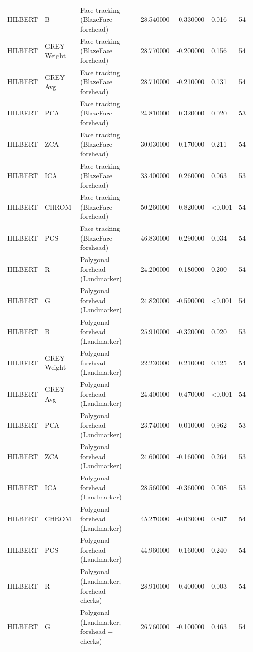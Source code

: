 \begin{table}[htbp]
\begin{tabular}{l l l r r l r}
HILBERT & B & Face tracking (BlazeFace forehead) & 28.540000 & -0.330000 & 0.016 & 54 \\
HILBERT & GREY Weight & Face tracking (BlazeFace forehead) & 28.770000 & -0.200000 & 0.156 & 54 \\
HILBERT & GREY Avg & Face tracking (BlazeFace forehead) & 28.710000 & -0.210000 & 0.131 & 54 \\
HILBERT & PCA & Face tracking (BlazeFace forehead) & 24.810000 & -0.320000 & 0.020 & 53 \\
HILBERT & ZCA & Face tracking (BlazeFace forehead) & 30.030000 & -0.170000 & 0.211 & 54 \\
HILBERT & ICA & Face tracking (BlazeFace forehead) & 33.400000 & 0.260000 & 0.063 & 53 \\
HILBERT & CHROM & Face tracking (BlazeFace forehead) & 50.260000 & 0.820000 & <0.001 & 54 \\
HILBERT & POS & Face tracking (BlazeFace forehead) & 46.830000 & 0.290000 & 0.034 & 54 \\
HILBERT & R & Polygonal forehead (Landmarker) & 24.200000 & -0.180000 & 0.200 & 54 \\
HILBERT & G & Polygonal forehead (Landmarker) & 24.820000 & -0.590000 & <0.001 & 54 \\
HILBERT & B & Polygonal forehead (Landmarker) & 25.910000 & -0.320000 & 0.020 & 53 \\
HILBERT & GREY Weight & Polygonal forehead (Landmarker) & 22.230000 & -0.210000 & 0.125 & 54 \\
HILBERT & GREY Avg & Polygonal forehead (Landmarker) & 24.400000 & -0.470000 & <0.001 & 54 \\
HILBERT & PCA & Polygonal forehead (Landmarker) & 23.740000 & -0.010000 & 0.962 & 53 \\
HILBERT & ZCA & Polygonal forehead (Landmarker) & 24.600000 & -0.160000 & 0.264 & 53 \\
HILBERT & ICA & Polygonal forehead (Landmarker) & 28.560000 & -0.360000 & 0.008 & 53 \\
HILBERT & CHROM & Polygonal forehead (Landmarker) & 45.270000 & -0.030000 & 0.807 & 54 \\
HILBERT & POS & Polygonal forehead (Landmarker) & 44.960000 & 0.160000 & 0.240 & 54 \\
HILBERT & R & Polygonal (Landmarker; forehead + cheeks) & 28.910000 & -0.400000 & 0.003 & 54 \\
HILBERT & G & Polygonal (Landmarker; forehead + cheeks) & 26.760000 & -0.100000 & 0.463 & 54 \\

\end{tabular}
\end{table}
